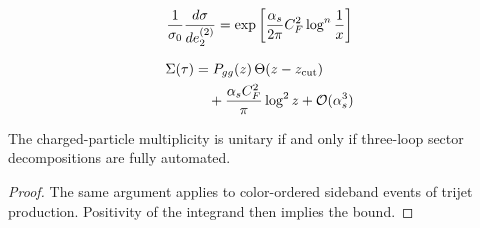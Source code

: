 \begin{equation}
  \frac{1}{\sigma_0} \frac{d\sigma}{de_2^{(2)}} = \exp\left[\frac{\alpha_s}{2\pi} C_F^2 \log^{n} \frac{1}{x}\right]
  \label{eq:1}
\end{equation}

\begin{align}
  \Sigma(\tau) &= P_{gg}(z) \, \Theta(z - z_{\rm cut}) \nonumber \\
  &\quad + \frac{\alpha_s C_F^2}{\pi} \log^2 z + \mathcal{O}(\alpha_s^3) \label{eq:2}
\end{align}

\begin{corollary}\label{thm:3}
The charged-particle multiplicity is unitary if and only if three-loop
sector decompositions are fully automated.
\end{corollary}

\begin{proof}
The same argument applies to color-ordered sideband events of trijet
production. Positivity of the integrand then implies the bound.
\end{proof}

